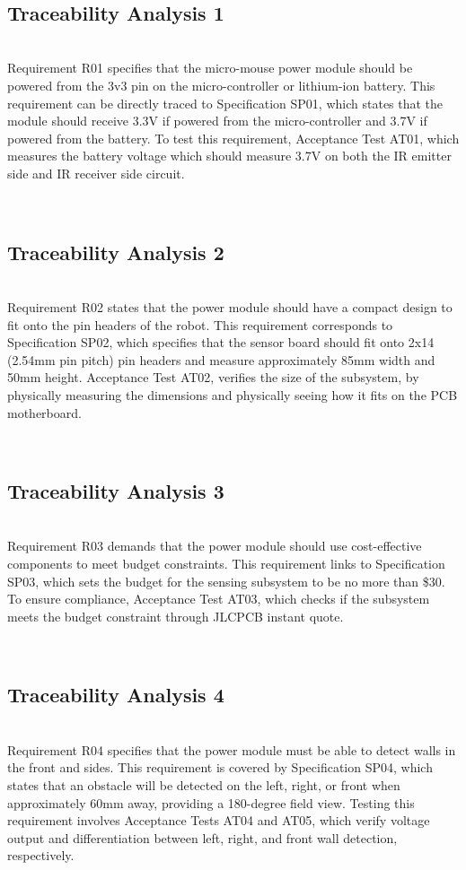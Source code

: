 \documentclass[class=report,11pt,crop=false]{standalone}
\begin{document}
\\ \subsection{Traceability Analysis 1} \\
Requirement R01 specifies that the micro-mouse power module should be powered from the 3v3 pin on the micro-controller or lithium-ion battery. This requirement can be directly traced to Specification SP01, which states that the module should receive 3.3V if powered from the micro-controller and 3.7V if powered from the battery. To test this requirement, Acceptance Test AT01, which measures the battery voltage which should measure 3.7V on both the IR emitter side and IR receiver side circuit.

\\ \subsection{Traceability Analysis 2} \\
Requirement R02 states that the power module should have a compact design to fit onto the pin headers of the robot. This requirement corresponds to Specification SP02, which specifies that the sensor board should fit onto 2x14 (2.54mm pin pitch) pin headers and measure approximately 85mm width and 50mm height. Acceptance Test AT02, verifies the size of the subsystem, by physically measuring the dimensions and physically seeing how it fits on the PCB motherboard.

\\ \subsection{Traceability Analysis 3} \\
Requirement R03 demands that the power module should use cost-effective components to meet budget constraints. This requirement links to Specification SP03, which sets the budget for the sensing subsystem to be no more than \$30. To ensure compliance, Acceptance Test AT03, which checks if the subsystem meets the budget constraint through JLCPCB instant quote.

\\ \subsection{Traceability Analysis 4} \\
Requirement R04 specifies that the power module must be able to detect walls in the front and sides. This requirement is covered by Specification SP04, which states that an obstacle will be detected on the left, right, or front when approximately 60mm away, providing a 180-degree field view. Testing this requirement involves Acceptance Tests AT04 and AT05, which verify voltage output and differentiation between left, right, and front wall detection, respectively.
\end{document}
